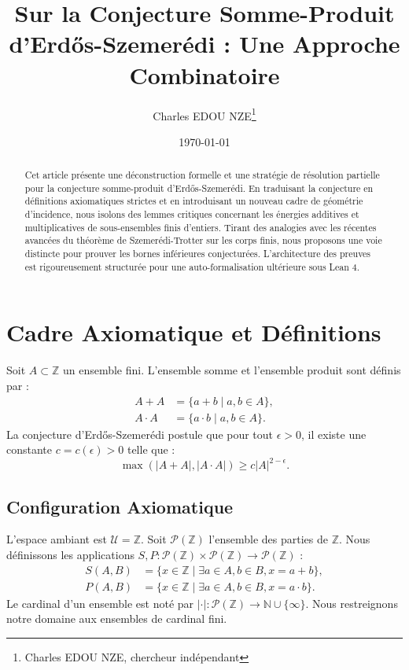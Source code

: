\documentclass[11pt,a4paper]{article}
\title{Sur la Conjecture Somme-Produit d'Erdős-Szemerédi : Une Approche Combinatoire}
\author{Charles EDOU NZE\thanks{Charles EDOU NZE, chercheur indépendant}}
\date{\today}
\begin{document}
\maketitle

\begin{abstract}
Cet article présente une déconstruction formelle et une stratégie de résolution partielle pour la conjecture somme-produit d'Erdős-Szemerédi. En traduisant la conjecture en définitions axiomatiques strictes et en introduisant un nouveau cadre de géométrie d'incidence, nous isolons des lemmes critiques concernant les énergies additives et multiplicatives de sous-ensembles finis d'entiers. Tirant des analogies avec les récentes avancées du théorème de Szemerédi-Trotter sur les corps finis, nous proposons une voie distincte pour prouver les bornes inférieures conjecturées. L'architecture des preuves est rigoureusement structurée pour une auto-formalisation ultérieure sous Lean 4.
\end{abstract}


\section{Cadre Axiomatique et Définitions}
Soit $A \subset \mathbb{Z}$ un ensemble fini. L'ensemble somme et l'ensemble produit sont définis par :
\begin{align*}
A + A &= \{a + b \mid a, b \in A\}, \\
A \cdot A &= \{a \cdot b \mid a, b \in A\}.
\end{align*}
La conjecture d'Erdős-Szemerédi postule que pour tout $\epsilon > 0$, il existe une constante $c = c(\epsilon) > 0$ telle que :
\begin{equation}
\max(|A + A|, |A \cdot A|) \geq c |A|^{2 - \epsilon}.
\end{equation}

\subsection{Configuration Axiomatique}
L'espace ambiant est $\mathcal{U} = \mathbb{Z}$.
Soit $\mathcal{P}(\mathbb{Z})$ l'ensemble des parties de $\mathbb{Z}$.
Nous définissons les applications $S, P: \mathcal{P}(\mathbb{Z}) \times \mathcal{P}(\mathbb{Z}) \to \mathcal{P}(\mathbb{Z})$ :
\begin{align*}
S(A, B) &= \{ x \in \mathbb{Z} \mid \exists a \in A, b \in B, x = a + b \}, \\
P(A, B) &= \{ x \in \mathbb{Z} \mid \exists a \in A, b \in B, x = a \cdot b \}.
\end{align*}
Le cardinal d'un ensemble est noté par $|\cdot|: \mathcal{P}(\mathbb{Z}) \to \mathbb{N} \cup \{\infty\}$. Nous restreignons notre domaine aux ensembles de cardinal fini.
\end{document}
